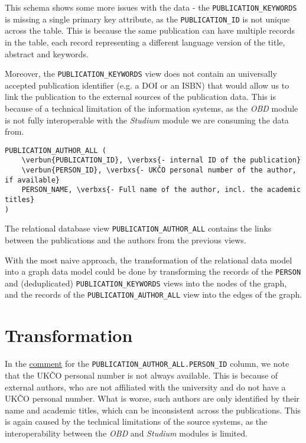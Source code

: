 This schema shows some more issues with the data - the \texttt{PUBLICATION\_KEYWORDS} is missing a single primary key attribute,
as the \texttt{PUBLICATION\_ID} is not unique across the table. This is because the same publication can have multiple records in the table,
each record representing a different language version of the title, abstract and keywords.

Moreover, the \texttt{PUBLICATION\_KEYWORDS} view does not contain an universally accepted publication identifier (e.g. a DOI or an ISBN) 
that would allow us to link the publication to the external sources of the publication data.
This is because of a technical limitation of the information systems, as the \textit{OBD} module is not fully interoperable with the \textit{Studium} module we are 
consuming the data from.

\newpage

\label{sec:pub-author-all}
\begin{Verbatim}[commandchars=\\\{\}]
PUBLICATION_AUTHOR_ALL (
    \verbun{PUBLICATION_ID}, \verbxs{- internal ID of the publication}
    \verbun{PERSON_ID}, \verbxs{- UKČO personal number of the author, if available}
    PERSON_NAME, \verbxs{- Full name of the author, incl. the academic titles}
)
\end{Verbatim}

The relational database view \texttt{PUBLICATION\_AUTHOR\_ALL} contains the links between the publications and the authors from the previous views.

With the most naive approach, the transformation of the relational data model into a graph data model could be done by transforming the records of the 
\texttt{PERSON} and (deduplicated) \texttt{PUBLICATION\_KEYWORDS} views into the nodes of the graph, 
and the records of the \texttt{PUBLICATION\_AUTHOR\_ALL} view into the edges of the graph.

\section{Transformation}

In the \hyperref[sec:pub-author-all]{comment} for the \texttt{PUBLICATION\_AUTHOR\_ALL.PERSON\_ID} column, we note that the UKČO personal number is not always available.
This is because of external authors, who are not affiliated with the university and do not have a UKČO personal number.
What is worse, such authors are only identified by their name and academic titles, which can be inconsistent across the publications.
This is again caused by the technical limitations of the source systems, as the interoperability between the \textit{OBD} and \textit{Studium} modules is limited.


